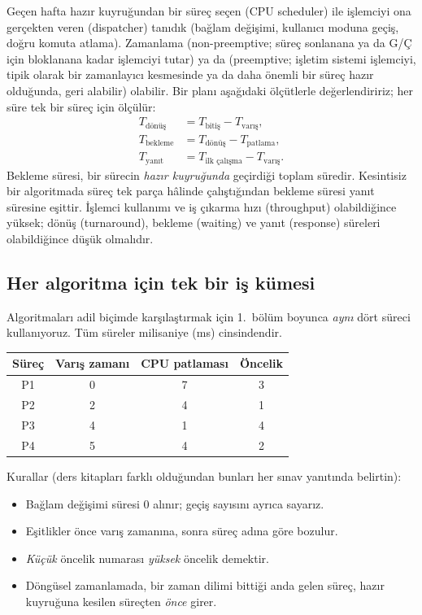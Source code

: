 Geçen hafta hazır kuyruğundan bir süreç seçen  (CPU scheduler) ile işlemciyi ona gerçekten veren  (dispatcher) tanıdık (bağlam değişimi, kullanıcı moduna geçiş, doğru komuta atlama). Zamanlama  (non-preemptive; süreç sonlanana ya da G/Ç için bloklanana kadar işlemciyi tutar) ya da  (preemptive; işletim sistemi işlemciyi, tipik olarak bir zamanlayıcı kesmesinde ya da daha önemli bir süreç hazır olduğunda, geri alabilir) olabilir. Bir planı aşağıdaki ölçütlerle değerlendiririz; her süre tek bir süreç için ölçülür:
\begin{align*}
T_{\text{dönüş}} &= T_{\text{bitiş}} - T_{\text{varış}},\\
T_{\text{bekleme}} &= T_{\text{dönüş}} - T_{\text{patlama}},\\
T_{\text{yanıt}} &= T_{\text{ilk çalışma}} - T_{\text{varış}}.
\end{align*}
Bekleme süresi, bir sürecin \emph{hazır kuyruğunda} geçirdiği toplam süredir. Kesintisiz bir algoritmada süreç tek parça hâlinde çalıştığından bekleme süresi yanıt süresine eşittir. İşlemci kullanımı ve iş çıkarma hızı (throughput) olabildiğince yüksek; dönüş (turnaround), bekleme (waiting) ve yanıt (response) süreleri olabildiğince düşük olmalıdır.

\subsection{Her algoritma için tek bir iş kümesi}
\label{sec:jobs}

Algoritmaları adil biçimde karşılaştırmak için 1.~bölüm boyunca \emph{aynı} dört süreci kullanıyoruz. Tüm süreler milisaniye (ms) cinsindendir.

\begin{center}
\renewcommand{\arraystretch}{1.25}
\begin{tabular}{@{}cccc@{}}
\toprule
\textbf{Süreç} & \textbf{Varış zamanı} & \textbf{CPU patlaması} & \textbf{Öncelik} \\
\midrule
P1 & 0 & 7 & 3 \\
P2 & 2 & 4 & 1 \\
P3 & 4 & 1 & 4 \\
P4 & 5 & 4 & 2 \\
\bottomrule
\end{tabular}
\end{center}

Kurallar (ders kitapları farklı olduğundan bunları her sınav yanıtında belirtin):
\begin{itemize}
  \item Bağlam değişimi süresi $0$ alınır; geçiş sayısını ayrıca sayarız.
  \item Eşitlikler önce varış zamanına, sonra süreç adına göre bozulur.
  \item \emph{Küçük} öncelik numarası \emph{yüksek} öncelik demektir.
  \item Döngüsel zamanlamada, bir zaman dilimi bittiği anda gelen süreç, hazır kuyruğuna kesilen süreçten \emph{önce} girer.
\end{itemize}

